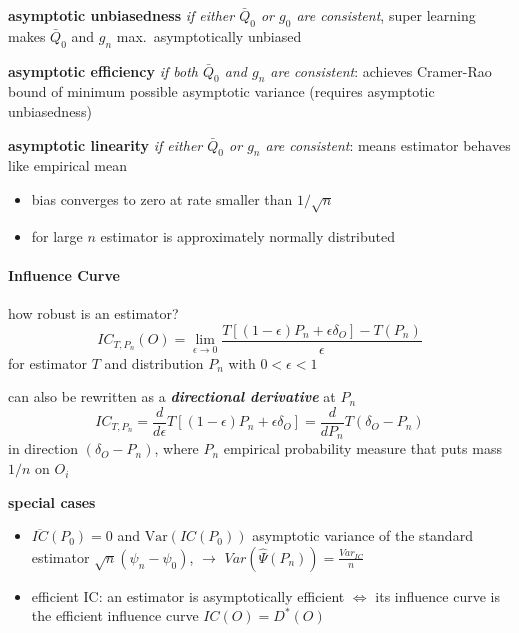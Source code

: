 \documentclass[8pt,twoside]{extarticle}
\begin{document}
\begin{multicols}{2}
\noindent \textbf{asymptotic unbiasedness}
\textit{if either $\bar{Q}_0$ or $g_0$ are consistent}, super learning makes $\bar{Q}_0$ and $g_n$ max.\ asymptotically unbiased

\noindent \textbf{asymptotic efficiency} \textit{if both $\bar{Q}_0$ and $g_n$ are consistent}: achieves Cramer-Rao bound of minimum possible asymptotic variance (requires asymptotic unbiasedness)

\noindent \textbf{asymptotic linearity} \textit{if either  $\bar{Q}_0$ or $g_n$ are consistent}: \newline means estimator behaves like empirical mean
\begin{itemize}[leftmargin=*, itemsep=0em, topsep=0pt, partopsep=0pt,parsep=0pt]
\setlength{\itemsep}{0pt}%
\setlength{\parskip}{0pt}
\item bias converges to zero at rate smaller than $1/\sqrt{n}$
\item for large $n$ estimator is approximately normally distributed
\end{itemize}

\paragraph{Influence Curve} how robust is an estimator? %
$$IC_{T,P_n}(O)=\lim_{\epsilon\to 0}\frac{T\left[\left(1-\epsilon\right)P_n + \epsilon\delta_O\right]-T(P_n)}{\epsilon}$$
for estimator $T$ and distribution $P_n$ with $0<\epsilon<1$ 


\noindent can also be rewritten as a \textit{\textbf{directional derivative}} at $P_n$
$$IC_{T,P_n}=\frac{d}{d\epsilon}T\left[\left(1-\epsilon\right)P_n + \epsilon\delta_O\right] = 
\frac{d}{dP_n}T\left(\delta_O - P_n\right)$$
in direction $(\delta_O - P_n)$, where $P_n$ empirical probability measure that puts mass $1/n$ on $O_i$ \citep{hampel1974influence}


\noindent \textbf{special cases} \citep{van2011targeted}
\begin{itemize}[leftmargin=*, itemsep=0em, topsep=0pt, partopsep=0pt,parsep=0pt]
\item $\overline{IC}(P_0) = 0$ and $\mathrm{Var}(IC(P_0))$ asymptotic variance of the standard estimator  $\sqrt{n} (\psi_n - \psi_0)$, $\to$ $Var(\hat{\Psi}(P_n)) = \frac{Var_{IC}}{n}$
\item efficient IC: an estimator is asymptotically efficient $\Leftrightarrow$ its influence curve is the efficient influence curve $IC(O)=D^*(O)$ 
\end{itemize}






\end{multicols}
\end{document}
